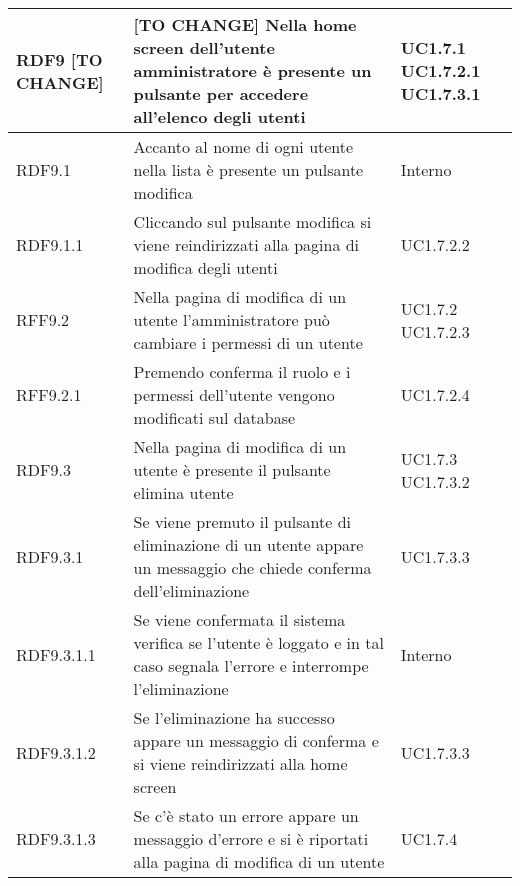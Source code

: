 \begin{center}
\begin{longtable}{| p{2.5cm} | p{8cm} | p{2cm} |}
		RDF9 [TO CHANGE] & [TO CHANGE] Nella home screen dell'utente amministratore è presente un pulsante per accedere all'elenco degli utenti  &  UC1.7.1 \newline UC1.7.2.1 \newline UC1.7.3.1 \\
		\hline
		RDF9.1  &  Accanto al nome di ogni utente nella lista è presente un pulsante modifica  &  Interno \\
		\hline
		RDF9.1.1  &  Cliccando sul pulsante modifica si viene reindirizzati alla pagina di modifica degli utenti  &  UC1.7.2.2 \\
		\hline
		RFF9.2  &  Nella pagina di modifica di un utente l'amministratore può cambiare i permessi di un utente  &  UC1.7.2 \newline UC1.7.2.3 \\
		\hline
		RFF9.2.1  &  Premendo conferma il ruolo e i permessi dell'utente vengono modificati sul database  &  UC1.7.2.4 \\
		\hline
		RDF9.3  &  Nella pagina di modifica di un utente è presente il pulsante elimina utente  &  UC1.7.3 \newline UC1.7.3.2 \\
		\hline
		RDF9.3.1  &  Se viene premuto il pulsante di eliminazione di un utente appare un messaggio che chiede conferma dell'eliminazione  & UC1.7.3.3\\
		\hline
		RDF9.3.1.1  &  Se viene confermata il sistema verifica se l'utente è loggato e in tal caso segnala l'errore e interrompe l'eliminazione  & Interno \\
		\hline
		RDF9.3.1.2  &  Se l'eliminazione ha successo appare un messaggio di conferma e si viene reindirizzati alla home screen  & UC1.7.3.3\\
		\hline
		RDF9.3.1.3  &  Se c'è stato un errore appare un messaggio d'errore e si è riportati alla pagina di modifica di un utente  & UC1.7.4\\
		\hline




\end{longtable}
\end{center}

